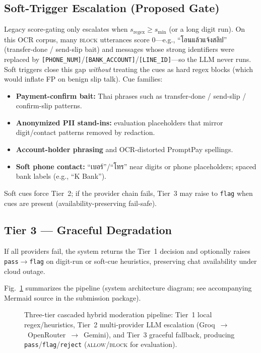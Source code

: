 \documentclass[conference]{IEEEtran}
\begin{document}
\subsection{Soft-Trigger Escalation (Proposed Gate)}
\label{sec:soft-trigger}
Legacy score-gating only escalates when $s_{\mathrm{regex}}\geq s_{\min}$ (or a
long digit run). On this OCR corpus, many \textsc{block} utterances score
$0$---e.g., ``โอนแล้วแจ้งสลิป'' (transfer-done / send-slip bait) and messages
whose strong identifiers were replaced by
\texttt{[PHONE\_NUM]}/\texttt{[BANK\_ACCOUNT]}/\texttt{[LINE\_ID]}---so the LLM
never runs. Soft triggers close this gap \emph{without} treating the cues as
hard regex blocks (which would inflate FP on benign slip talk). Cue families:
\begin{itemize}
  \item \textbf{Payment-confirm bait:} Thai phrases such as transfer-done /
        send-slip / confirm-slip patterns.
  \item \textbf{Anonymized PII stand-ins:} evaluation placeholders that mirror
        digit/contact patterns removed by redaction.
  \item \textbf{Account-holder phrasing} and OCR-distorted PromptPay spellings.
  \item \textbf{Soft phone contact:} ``เบอร์''/``โทร'' near digits or phone
        placeholders; spaced bank labels (e.g., ``K Bank'').
\end{itemize}
Soft cues force Tier~2; if the provider chain fails, Tier~3 may raise to
\texttt{flag} when cues are present (availability-preserving fail-safe).

\subsection{Tier 3 --- Graceful Degradation}
If all providers fail, the system returns the Tier~1 decision and optionally
raises \texttt{pass}$\rightarrow$\texttt{flag} on digit-run or soft-cue
heuristics, preserving chat availability under cloud outage.

Fig.~\ref{fig:architecture} summarizes the pipeline (system architecture diagram;
see accompanying Mermaid source in the submission package).

\begin{figure}[t]
\centering
{}
\caption{Three-tier cascaded hybrid moderation pipeline: Tier~1 local
regex/heuristics, Tier~2 multi-provider LLM escalation
(Groq~$\rightarrow$~OpenRouter~$\rightarrow$~Gemini), and Tier~3 graceful
fallback, producing \texttt{pass}/\texttt{flag}/\texttt{reject}
(\textsc{allow}/\textsc{block} for evaluation).}
\label{fig:architecture}
\end{figure}
\end{document}
